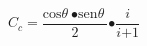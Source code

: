 \begin{equation}
C_c\mathrm{=}\frac{{\mathrm{cos} \theta \ }\mathrm{\bullet }{\mathrm{sen} \theta \ }}{\mathrm{2}}\mathrm{\bullet }\frac{i}{i\mathrm{+1}}
\end{equation}